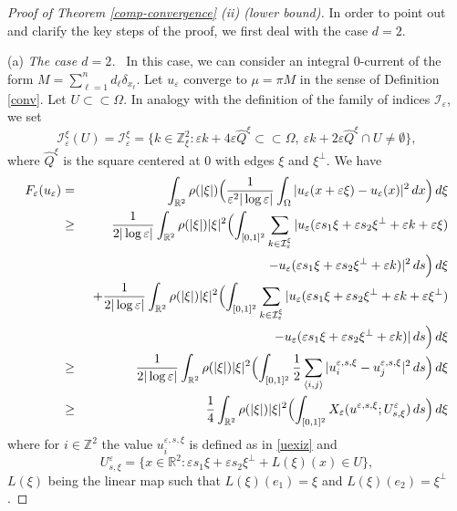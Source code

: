 \documentclass[11pt]{article}
\def\e{\varepsilon}
\def\dx{\,dx}
\begin{document}
\begin{proof}[Proof of Theorem {\rm\ref{comp-convergence}} {\rm (ii)} (lower bound)] 
In order to point out and clarify the key steps of the proof, we first deal with the case $d=2$. 
\smallskip 

\noindent(a) {\em The case $d=2$.} \ In this case, we can consider an integral $0$-current of the form 
$M=\sum_{\ell=1}^nd_{\ell}\delta_{x_\ell}$. 
Let $u_\e$ converge to $\mu=\pi M$ in the sense of Definition 
\ref{conv}. 
Let $U\subset\subset\Omega$. In analogy with the definition of the family of indices $\mathcal I_\e$, we set 
$$\mathcal I_\e^\xi(U)=\mathcal I_\e^\xi=\{k\in\mathbb Z^2_\xi: \e k+4\e \widehat Q^\xi\subset\subset \Omega, \ 
\e k+2\e \widehat Q^\xi\cap U\neq\emptyset\},$$ 
where $\widehat Q^\xi$ is the square centered at $0$ with edges $\xi$ and $\xi^\perp$. 
We have 
\begin{eqnarray}\label{primainf}
F_\e(u_\e)&=&\int_{\mathbb R^2}\rho(|\xi|) \Bigl({1\over\e^2|\log\e|}\int_{\Omega} |u_\e(x+\e\xi)-u_\e(x)|^2\dx\Bigr)\,d\xi\nonumber\\
&\geq& \frac{1}{2|\log\e|}\int_{\mathbb R^2}\rho(|\xi|)|\xi|^2 
\Bigl(\int_{[0,1]^2}\sum_{k\in\mathcal I_\e^\xi} |u_\e(\e s_1 \xi+ \e s_2\xi^\perp+\e k+\e \xi)\nonumber\\
&&\hspace{5cm}-u_\e(\e s_1 \xi+\e s_2\xi^\perp +\e k)|^2 \, ds\Bigr)\,d\xi\nonumber\\
&&+\frac{1}{2|\log\e|}\int_{\mathbb R^2}\rho(|\xi|)|\xi|^2 
\Bigl(\int_{[0,1]^2}\sum_{k\in\mathcal I_\e^\xi} |u_\e(\e s_1 \xi+\e s_2\xi^\perp+\e k+\e \xi^\perp)\nonumber\\
&&\hspace{5cm}-u_\e(\e s_1 \xi+\e s_2\xi^\perp +\e k)|   \, ds\Bigr)\,d\xi\nonumber\\
&\geq& \frac{1}{2|\log\e|}\int_{\mathbb R^2}\rho(|\xi|)|\xi|^2 
\Bigl(\int_{[0,1]^2}\frac{1}{2}\sum_{\langle i, j\rangle} |u_i^{\e,s,\xi}-u_j^{\e,s,\xi}|^2 \, ds\Bigr)\,d\xi\nonumber\\
&\geq& \frac{1}{4}\int_{\mathbb R^2}\rho(|\xi|)|\xi|^2 
\Bigl(\int_{[0,1]^2}X_\e (u^{\e,s,\xi}; U^\e_{s,\xi}) \, ds\Bigr)\,d\xi
\end{eqnarray}
where for $i\in\mathbb Z^2$ the value $u^{\e,s,\xi}_i$ is defined as in \eqref{uexiz} and  
$$U^\e_{s,\xi}=\{x\in\mathbb R^2: \e s_1 \xi+\e s_2\xi^\perp +L(\xi)(x)\in U\},$$  
 $L(\xi)$ being the linear map such that $L(\xi)(e_1)=\xi$ and $L(\xi)(e_2)=\xi^\perp$. 


\end{proof}
\end{document}
